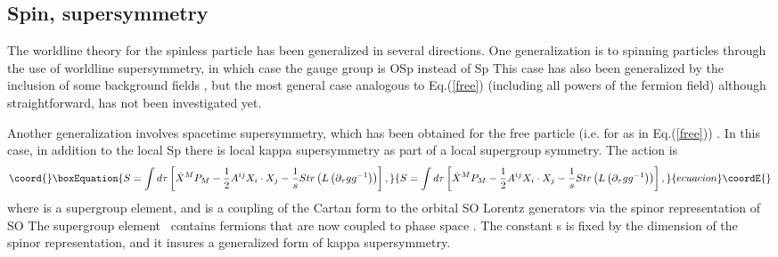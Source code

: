 \documentclass[a4paper,12pt]{article}
\begin{document}
\subsection{Spin, supersymmetry}

The worldline theory for the spinless particle has been
generalized in several directions. One generalization is to
spinning particles through the use of worldline supersymmetry, in
which case the gauge group is OSp\coordHE{} instead of
Sp\coordHE{} \cite{spin2t}\coordHE{} This case has also been
generalized by the inclusion of some background fields \cite
{field2T}, but the most general case analogous to Eq.(\ref{free})
(including all powers of the fermion field) although
straightforward, has not been investigated yet.

Another generalization involves spacetime supersymmetry, which has
been obtained for the free particle (i.e. for \coordHE{} as in Eq.(\ref{free})) \cite{super2t}\cite{survey2T}. In
this case, in addition to the local Sp\coordHE{} there
is local kappa supersymmetry as part of a local supergroup
symmetry. The action is
\begin{equation}\coord{}\boxEquation{
S=\int d\tau \left[ \dot{X}^{M}P_{M}-\frac{1}{2}A^{ij} X_{i}\cdot
X_{j} -\frac{1}{s}Str\left( L\left( \partial _{\tau
}gg^{-1}\right) \right) \right] ,  \label{Lsuper}
}{
S=\int d\tau \left[ \dot{X}^{M}P_{M}-\frac{1}{2}A^{ij} X_{i}\cdot
X_{j} -\frac{1}{s}Str\left( L\left( \partial _{\tau
}gg^{-1}\right) \right) \right] ,  }{ecuacion}\coordE{}\end{equation}
where \coordHE{} is a supergroup element, and \coordHE{}
is a coupling of the Cartan form \coordHE{} to the
orbital SO\coordHE{} Lorentz generators
\coordHE{} via the spinor representation
\coordHE{} of SO\coordHE{} The supergroup element\
\coordHE{} contains fermions \myHighlight{$\Theta $}\coordHE{} that are now coupled to phase
space \myHighlight{$X^{M},P_{M}$}\coordHE{}. The constant s is fixed by the dimension of
the spinor representation, and it insures a generalized form of
kappa supersymmetry.
\end{document}
